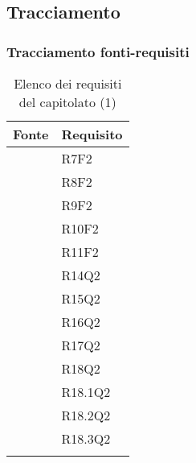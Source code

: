 	\subsection{Tracciamento}

		\subsubsection{Tracciamento fonti-requisiti}

		\begin{table}[H]
			\centering
			{\def\arraystretch{1.4}
			\begin{tabularx}{\textwidth}{YY}
				\textbf{Fonte} & \textbf{Requisito} \\
				\toprule
				 & R7F2 \\
				 & R8F2 \\
				 & R9F2 \\
				 & R10F2 \\
				 & R11F2 \\
				 & R14Q2 \\
				 & R15Q2 \\
				 & R16Q2 \\
				 & R17Q2 \\
				 & R18Q2 \\
				 & R18.1Q2 \\
				 & R18.2Q2 \\
				  & R18.3Q2 \\
				\bottomrule\\
			\end{tabularx}}
			\caption{Elenco dei requisiti del capitolato (1)}
		\end{table}

